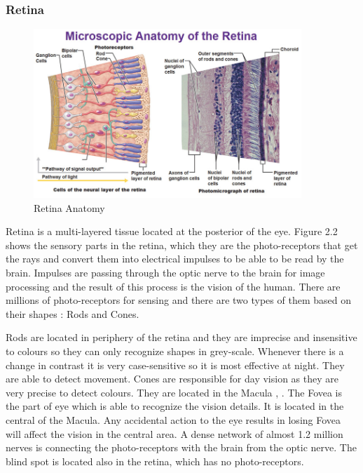 \subsubsection{Retina}
\begin{figure}[htb]
        \centering
        \includegraphics[width = 0.9\textwidth]{figures/Retina.jpg} %
  \caption{Retina Anatomy \cite{retinaimage}}
  \label{fig:Retinaanatomy}
\end{figure}  
Retina is a multi-layered tissue located at the posterior of the eye.
Figure 2.2 shows the sensory parts in the retina, which they are the photo-receptors that get the rays and convert them into electrical impulses to be able to be read by the brain.
Impulses are passing through the optic nerve to the brain for image processing and the result of this process is the vision of the human.
There are millions of photo-receptors for sensing and there are two types of them based on their shapes : Rods and Cones.

Rods are located in periphery of the retina and they are imprecise and insensitive to colours so they can only recognize shapes in grey-scale.
Whenever there is a change in contrast it is very case-sensitive so it is most effective at night.
They are able to detect movement.    
Cones are responsible for day vision as they are very precise to detect colours.
They are located in the Macula \cite{mccaa1982eye}, \cite{abramoff2010retinal}.
The Fovea is the part of eye which is able to recognize the vision details. It is located in the central of the Macula.
Any accidental action to the eye results in losing Fovea will affect the vision in the central area.
A dense network of almost 1.2 million nerves is connecting the photo-receptors with the brain from the optic nerve.
The blind spot is located also in the retina, which has no photo-receptors.

